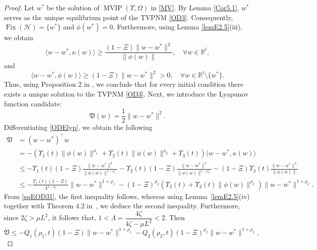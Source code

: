 \documentclass{article}
\theoremstyle{plain}%
\theoremstyle{thmstyletwo}%
\theoremstyle{thmstylethree}%
\begin{document}
\begin{proof}
Let $w^*$ be the solution of $\operatorname{MVIP}(\Upsilon, \Omega)$ in \eqref{MV}. By Lemma \eqref{Cor5.1}, $w^*$ serves as the unique equilibrium point of the TVPNM \eqref{OD3}. Consequently, $\operatorname{Fix}(\mathcal{H})=\{w^*\}$ and $\phi(w^*)=0$. Furthermore, using Lemma \eqref{lemE2.5}(iii), we obtain
\begin{equation}\label{eqEOD31}
    \langle w - w^*, \kappa(w) \rangle \geq \frac{(1- \Xi)\|w - w^*\|^2}{\|\phi(w)\|}, \quad \forall w \in \mathbb{R}^l,
\end{equation}
and
\[
\langle w - w^*, \phi(w) \rangle \geq (1- \Xi)\|w - w^*\|^2 > 0, \quad \forall w \in \mathbb{R}^l \setminus \{w^*\}.
\]
Thus, using Proposition 2 in \cite{26}, we conclude that for every initial condition there exists a unique solution to the TVPNM \eqref{OD3}. Next, we introduce the Lyapunov function candidate:
\begin{equation}\label{ODElyp}
    \mathfrak{V}(w) = \frac{1}{2} \|w - w^*\|^2.
\end{equation}
Differentiating \eqref{ODElyp}, we obtain the following
\begin{equation}
    \begin{split}
        \dot{\mathfrak{V}} &= (w - w^*)^{\top} \dot{w} \\
&= -\left(\Upsilon_1(t) \|\phi(w)\|^{\rho_1} + \Upsilon_2(t) \|\phi(w)\|^{\rho_2} + \Upsilon_3(t) \right) \langle w - w^*, \kappa(w) \rangle \\
&\leq -\Upsilon_1(t)(1- \Xi) \frac{\|w - w^*\|^2}{\|\phi(w)\|^{1-\rho_1}} - \Upsilon_2(t)(1- \Xi) \frac{\|w - w^*\|^2}{\|\phi(w)\|^{1-\rho_2}} - (1- \Xi)\Upsilon_3(t)\frac{\|w - w^*\|^2}{\|\phi(w)\|} \\
&\leq -\frac{\Upsilon_1(t)(1- \Xi)}{\Lambda^{1-\rho_1}} \|w - w^*\|^{1+\rho_1} - (1- \Xi)^{\rho_2} \left( \Upsilon_2(t) + \Upsilon_3(t) \|\phi(w)\|^{\rho_2} \right) \|w - w^*\|^{1+\rho_2}.
    \end{split}
\end{equation}
From \eqref{eqEOD31}, the first inequality follows, whereas using Lemma~\eqref{lemE2.5}(iv) together with Theorem 4.2 in~\cite{25}, we deduce the second inequality. Furthermore, since $2\zeta > \mu L^{2}$, it follows that, $1 < \Lambda = \dfrac{4\zeta}{4\zeta - \mu L^{2}} < 2$. Then
\begin{equation}\label{eqvk1}
    \dot{\mathfrak{V}} \leq -Q_1(\rho_1,t)(1- \Xi) \|w - w^*\|^{1+\rho_1} - Q_2(\rho_2, t)(1- \Xi)^{\rho_2} \|w - w^*\|^{1+\rho_2},
\end{equation}

\end{proof}
\end{document}
